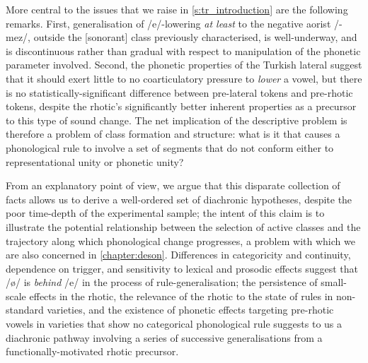 More central to the issues that we raise in \cref{s:tr_introduction} are the following remarks. First, generalisation of /e/-lowering \emph{at least} to the negative aorist /-mez/, outside the [sonorant] class previously characterised, is well-underway, and is discontinuous rather than gradual with respect to manipulation of the phonetic parameter involved. Second, the phonetic properties of the Turkish lateral suggest that it should exert little to no coarticulatory pressure to \emph{lower} a vowel, but there is no statistically-significant difference between pre-lateral tokens and pre-rhotic tokens, despite the rhotic's significantly better inherent properties as a precursor to this type of sound change. The net implication of the descriptive problem is therefore a problem of class formation and structure: what is it that causes a phonological rule to involve a set of segments that do not conform either to representational unity or phonetic unity?

From an explanatory point of view, we argue that this disparate collection of facts allows us to derive a well-ordered set of diachronic hypotheses, despite the poor time-depth of the experimental sample; the intent of this claim is to illustrate the potential relationship between the selection of active classes and the trajectory along which phonological change progresses, a problem with which we are also concerned in \cref{chapter:deson}. Differences in categoricity and continuity, dependence on trigger, and sensitivity to lexical and prosodic effects suggest that /\o/ is \emph{behind} /e/ in the process of rule-generalisation; the persistence of small-scale effects in the rhotic, the relevance of the rhotic to the state of rules in non-standard varieties, and the existence of phonetic effects targeting pre-rhotic vowels in varieties that show no categorical phonological rule suggests to us a diachronic pathway involving a series of successive generalisations from a functionally-motivated rhotic precursor.
